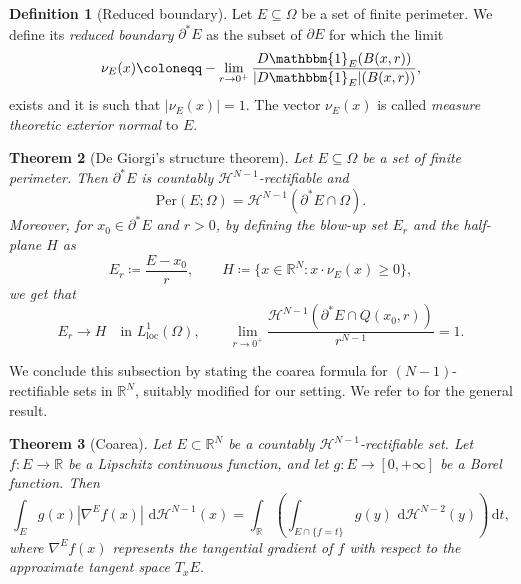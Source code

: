 \documentclass[a4paper, 11pt, reqno]{amsart}
\theoremstyle{plain}
\newtheorem{theorem}{Theorem}[section]
\theoremstyle{definition}
\newtheorem{definition}[theorem]{Definition}
\theoremstyle{remark}
\newcommand{\R}{\mathbb R}
\newcommand{\dd}{\,\mathrm{d}}
\begin{document}
\begin{definition}[Reduced boundary]
    Let $E \subseteq \Omega$ be a set of finite perimeter. We define its \emph{reduced boundary} $\partial^* \!E$ as the subset of $\partial E$ for which the limit 
    \begin{equation*}
        \nu_E (x) \coloneqq - \lim_{r \to 0^+} \frac{D\mathbbm{1}_E (B(x,r))}{| D \mathbbm{1}_E | (B(x,r))},
    \end{equation*}
    exists and it is such that $| \nu_E (x) | = 1$. The vector $\nu_E (x)$ is called \emph{measure theoretic exterior normal} to $E$.
\end{definition}

\begin{theorem}[De Giorgi's structure theorem]
    Let $E \subseteq \Omega $ be a set of finite perimeter. Then $\partial^* \! E$ is countably $\mathcal{H}^{N-1}$-rectifiable and
    \begin{equation}
        \mathrm{Per}(E; \Omega) = \mathcal{H}^{N-1}(\partial^* \! E \cap \Omega).
    \end{equation}
    Moreover, for $x_0 \in \partial^* \! E$ and $r > 0$, by defining the blow-up set $E_r$ and the half-plane $H$ as
    \begin{equation*}
        E_r \coloneqq \frac{E - x_0}{r}, \qquad H \coloneqq \{x \in \R^N : x \cdot \nu_E (x) \geq 0 \},
    \end{equation*}
    we get that
    $$ E_r \to H \quad \text{in } L^1_\text{loc} (\Omega), \qquad \lim_{r \to 0^+} \frac{\mathcal{H}^{N-1}( \partial^* \! E \cap Q(x_0,r))}{r^{N-1}} = 1. $$
\end{theorem}

We conclude this subsection by stating the coarea formula for $(N-1)$-rectifiable sets in $\R^N$, suitably modified for our setting. We refer to \cite[Theorem 2.93]{AFP} for the general result.
\begin{theorem}[Coarea]
    Let $E \subset \R^N$ be a countably $\mathcal{H}^{N-1}$-rectifiable set. Let $f \colon E \to \R$ be a Lipschitz continuous function, and let $g : E \to [0,+\infty]$ be a Borel function. Then
    \begin{equation}
        \int_E g(x) | \nabla^E f(x) | \, \dd \mathcal{H}^{N-1} (x) = \int_{\R} \left( \int_{E \cap \{ f = t \}} g(y) \, \dd \mathcal{H}^{N-2} (y) \right) \dd t,
    \end{equation}
    where $\nabla^E f(x)$ represents the tangential gradient of $f$ with respect to the approximate tangent space $T_x E$.
\end{theorem}
\end{document}
